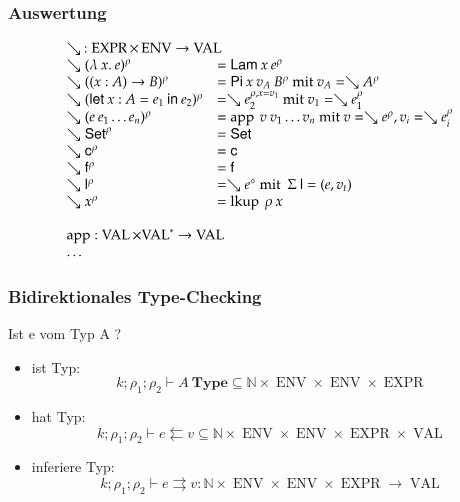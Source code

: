 \documentclass[12pt,red,serif,mathserif]{beamer}
\newcommand{\ves}[1]{{#1}^{\ast}}
\newcommand{\Set}{\mathsf{Set}}
\newcommand{\EPi}[2]{( #1 : #2 ) \rightarrow}
\newcommand{\ELet}[3]{\mathsf{let}\: #1 : #2 = #3 \: \mathsf{in}\:}
\newcommand{\lam}[1]{\lambda\: #1 .\:}
\newcommand{\ra}{\rightarrow}
\newcommand{\spc}{\hspace*{2mm}}
\newcommand{\dd}{\mathsf{l}}
\newcommand{\cc}{\mathsf{c}}
\newcommand{\ff}{\mathsf{f}}
\newcommand{\cN}{\mathbb{N}}
\newcommand{\opn}[1]{\operatorname{#1}}
\newcommand{\Expr}{\opn{EXPR}}
\newcommand{\Val}{\opn{VAL}}
\newcommand{\vlam}{\mathsf{Lam}}
\newcommand{\vpi}{\mathsf{Pi}}
\newcommand{\cl}[2]{#1^{#2}}
\newcommand{\clp}[2]{\cl{(#1)}{#2}}
\newcommand{\Env}{\opn{ENV}}
\newcommand{\wh}{\searrow}
\newcommand{\ap}{\opn{app}}
\newcommand{\lkup}{\opn{lkup}}
\newcommand{\ins}[3]{#1,#2=#3}
\newcommand{\Sig}{\Sigma}
\begin{document}
\frame
{
  \frametitle{Auswertung}

\[
\begin{array}{ll}
\multicolumn{2}{l}{\wh \: : \Expr \times \Env \ra \Val}\\
\wh \clp{\lam{x}{e}}{\rho} & = \vlam \: x \: \cl{e}{\rho} \\
\wh \clp{\EPi{x}{A}{B}}{\rho} &= \vpi \: x \: v_A \: \cl{B}{\rho} \mbox{ mit } v_A = \wh \cl{A}{\rho} \\
\wh \clp{\ELet{x}{A}{e_1}{e_2}}{\rho} &= \wh \cl{e_2}{\ins{\rho}{x}{v_1}} \mbox { mit } v_1 = \wh \cl{e_1}{\rho} \\
\wh \clp{e \: e_1 \ldots e_n}{\rho} &= \ap \: v \: v_1 \ldots v_n \mbox{ mit } v = \wh \cl{e}{\rho} , v_i = \wh \cl{e_i}{\rho}\\
\wh \cl{\Set}{\rho} & = \Set \\
\wh \cl{\cc}{\rho} & = \cc  \\
\wh \cl{\ff}{\rho} & = \ff \\
\wh \cl{\dd}{\rho} & = \wh \cl{e}{\diamond} \mbox{ mit } \: \Sig \: \dd = (e,v_t)\\
\wh \cl{x}{\rho} & = \lkup \: \rho \: x \\
\spc\\
\multicolumn{2}{l}{\ap : \Val \times \ves{\Val} \ra \Val}\\
\ldots\\
\end{array}
\]
}

\renewcommand\Check[5]{#1;#2;#3\vdash#4\leftleftarrows#5}
\newcommand\IsType[4]{#1;#2;#3\vdash#4\:\mathbf{Type}}
\newcommand\DataType[5]{#1;#2;#3;#4\vdash#5\:\mathbf{DataType}}
\newcommand\ConType[5]{#1;#2;#3;#4\vdash#5\:\mathbf{ConType}}
\newcommand\Infer[5]{#1;#2;#3\vdash#4\rightrightarrows#5}
\newcommand\EqVal[4]{#1;#2\vdash#3\Leftrightarrow#4}
\newcommand\FeqVal[4]{#1;#2\vdash#3{\:\leftrightarrow\:}#4}
\newcommand\DeqVal[2]{\vdash#1\leftrightarrow#2}
\newcommand\LeqVal[4]{#1;#2;\vdash#3\:\leqq\:#4}
\newcommand\FleqVal[4]{#1;#2\vdash#3{\:\ll\:}#4}
\newcommand\DLeqVal[2]{\vdash#1\leq#2}
\newcommand\SzLeq[2]{\vdash#1\sqsubseteq#2}

\frame
{
  \frametitle{Bidirektionales Type-Checking}

Ist e vom Typ A ?
\vspace*{0.2cm}
\begin{itemize}
\item
ist Typ: \[\IsType{k}{\rho_1}{\rho_2}{A} \subseteq \cN \times \Env \times \Env \times \Expr \]
\item
hat Typ: \[\Check{k}{\rho_1}{\rho_2}{e}{v} \subseteq \cN \times \Env \times \Env \times \Expr \times \Val\]
\item
inferiere Typ: \[\Infer{k}{\rho_1}{\rho_2}{e}{v} : \cN \times \Env \times \Env \times \Expr \ra \Val\]

\end{itemize}
}
\end{document}
